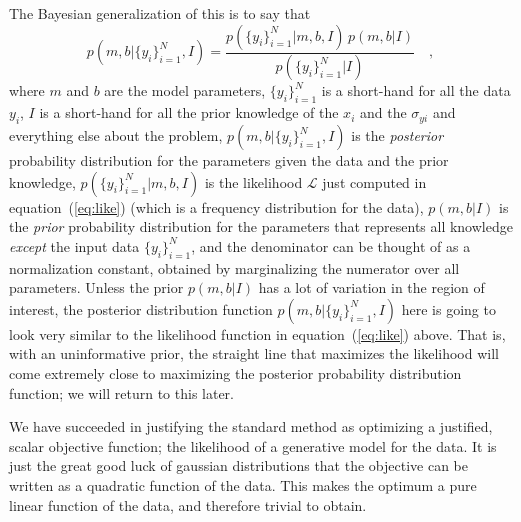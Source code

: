 \documentclass[12pt,twoside]{article}
\newcommand{\equationname}{equation}
\newcounter{problem}
\newcommand{\setofall}[3]{\{{#1}\}_{{#2}}^{{#3}}}
\newcommand{\ally}{\setofall{y_i}{i=1}{N}}
\newcommand{\like}{\mathscr{L}}
\begin{document}
The Bayesian generalization of this is to say that
\begin{equation}
p(m,b|\ally,I) = \frac{p(\ally|m,b,I)\,p(m,b|I)}{p(\ally|I)} \quad ,
\end{equation}
where $m$ and $b$ are the model parameters, $\ally$ is a short-hand
for all the data $y_i$, $I$ is a short-hand for all the prior
knowledge of the $x_i$ and the $\sigma_{yi}$ and everything else about
the problem, $p(m,b|\ally,I)$ is the \emph{posterior} probability
distribution for the parameters given the data and the prior
knowledge, $p(\ally|m,b,I)$ is the likelihood $\like$ just computed in
\equationname~(\ref{eq:like}) (which is a frequency distribution for
the data), $p(m,b|I)$ is the \emph{prior} probability distribution for
the parameters that represents all knowledge \emph{except} the input
data $\ally$, and the denominator can be thought of as a normalization
constant, obtained by marginalizing the numerator over all
parameters. Unless the prior $p(m,b|I)$ has a lot of variation in the
region of interest, the posterior distribution function
$p(m,b|\ally,I)$ here is going to look very similar to the likelihood
function in \equationname~(\ref{eq:like}) above.  That is, with an
uninformative prior, the straight line that maximizes the likelihood
will come extremely close to maximizing the posterior probability
distribution function; we will return to this later.

We have succeeded in justifying the standard method as optimizing a
justified, scalar objective function; the likelihood of a generative
model for the data.  It is just the great good luck of gaussian
distributions that the objective can be written as a quadratic
function of the data.  This makes the optimum a pure linear function
of the data, and therefore trivial to obtain.
\end{document}
